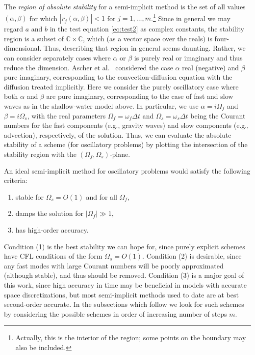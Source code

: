 \documentclass[12pt]{article}
\newcommand{\C}{\mathbb{C}}
\newcommand{\dt}{\Delta t}
\newcommand{\abs}[1]{\left|{#1}\right|}
\begin{document}
The \emph{region of absolute stability} for a semi-implicit method is the set
of all values $(\alpha,\beta)$ for which $\abs{r_j(\alpha,\beta)}<1$ for
$j=1,\dots,m$.\footnote{Actually, this is the interior of the region; some
points on the boundary may also be included.} Since in general we may regard
$a$ and $b$ in the test equation \eqref{eq:test2} as complex constants, the
stability region is a subset of $\C\times\C$, which (as a vector space over
the reals) is four-dimensional.  Thus, describing that region in general seems
daunting.  Rather, we can consider separately cases where $\alpha$ or $\beta$
is purely real or imaginary and thus reduce the dimension.  Ascher et
al.~\cite{Ascher_Ruuth_Wetton95} considered the case $\alpha$ real (negative)
and $\beta$ pure imaginary, corresponding to the convection-diffusion equation
with the diffusion treated implicitly.  Here we consider the purely
oscillatory case where both $\alpha$ and $\beta$ are pure imaginary,
corresponding to the case of fast and slow waves as in the shallow-water model
above.  In particular, we use $\alpha=i\Omega_f$ and $\beta=i\Omega_s$, with
the real parameters $\Omega_f=\omega_f\dt$ and $\Omega_s=\omega_s\dt$ being
the Courant numbers for the fast components (e.g., gravity waves) and slow
components (e.g., advection), respectively, of the solution.  Thus, we can
evaluate the absolute stability of a scheme (for oscillatory problems) by
plotting the intersection of the stability region with the 
$(\Omega_f,\Omega_s)$-plane.

\pagebreak[2]

An ideal semi-implicit method for oscillatory problems would satisfy the
following criteria:
\begin{enumerate}
\setlength{\itemsep}{2pt} \setlength{\parsep}{0pt}
\setlength{\topsep}{0pt} \setlength{\partopsep}{0pt}
\setlength{\itemsep}{0pt}
\item stable for $\Omega_s=O(1)$ and for all $\Omega_f$,
\item damps the solution for $\abs{\Omega_f}\gg1$,
\item has high-order accuracy.
\end{enumerate}
Condition (1) is the best stability we can hope for, since purely 
explicit schemes have CFL conditions of the form $\Omega_s=O(1)$.
Condition (2) is desirable, since any fast modes with large Courant numbers
will be poorly approximated (although stable), and thus should be removed.
Condition (3) is a major goal of this work, since high accuracy in time may be
beneficial in models with accurate space discretizations, but most
semi-implicit methods used to date are at best second-order accurate.
In the subsections which follow we look for such schemes by considering the
possible schemes in order of increasing number of steps $m$.
\end{document}
